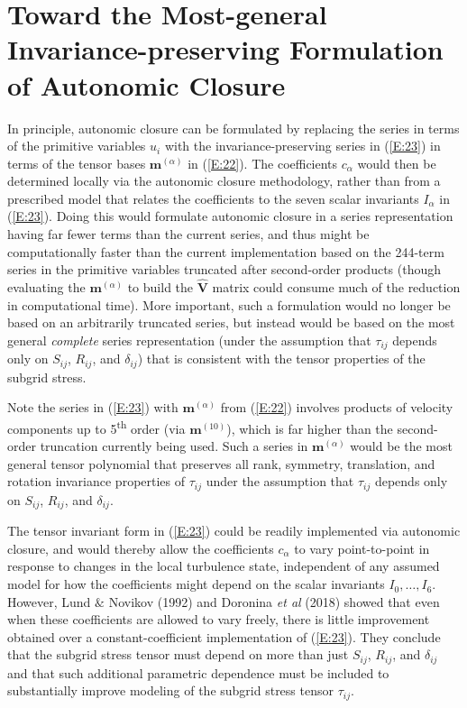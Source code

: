 \section{Toward the Most-general Invariance-preserving Formulation of Autonomic Closure} 
\label{sec:1B}

In principle, autonomic closure can be formulated by replacing the  series in terms of the primitive variables $u_i$  with the invariance-preserving series in (\ref{E:23}) in terms of the tensor bases $\mathbf{m}^{(\alpha)}$  in (\ref{E:22}). The coefficients $c_{\alpha}$  would then be determined locally via the autonomic closure methodology, rather than from a prescribed model that relates the coefficients to the seven scalar invariants $I_{\alpha}$ in (\ref{E:23}). Doing this would formulate autonomic closure in a series representation having far fewer terms than the current  series, and thus might be computationally faster than the current implementation based on the 244-term series in the primitive variables truncated after second-order products (though evaluating the  $\mathbf{m}^{(\alpha)}$  to build the $\mathbf{\widehat{V}}$  matrix could consume much of the reduction in computational time). More important, such a formulation would no longer be based on an arbitrarily truncated  series, but instead would be based on the most general \textit{complete} series representation (under the assumption that $\tau_{ij}$  depends only on $S_{ij}$, $R_{ij}$, and $\delta_{ij}$) that is consistent with the tensor properties of the subgrid stress. 

Note the series in (\ref{E:23}) with  $\mathbf{m}^{(\alpha)}$ from (\ref{E:22}) involves products of velocity components up to 5\textsuperscript{th} order (via $\mathbf{m}^{(10)}$), which is far higher than the second-order truncation currently being used. Such a series in  $\mathbf{m}^{(\alpha)}$ would be the most general tensor polynomial that preserves all rank, symmetry, translation, and rotation invariance properties of  $\tau_{ij}$ under the assumption that  $\tau_{ij}$ depends only on $S_{ij}$, $R_{ij}$, and $\delta_{ij}$.

The tensor invariant form in (\ref{E:23}) could be readily implemented via autonomic closure, and would thereby allow the coefficients $c_{\alpha}$  to vary point-to-point in response to changes in the local turbulence state, independent of any assumed model for how the coefficients might depend on the scalar invariants $I_0,\ldots,I_6$. However, Lund $\&$ Novikov (1992) and Doronina \textit{et al} (2018) showed that even when these coefficients are allowed to vary freely, there is little improvement obtained over a constant-coefficient implementation of (\ref{E:23}). They conclude that the subgrid stress tensor must depend on more than just $S_{ij}$, $R_{ij}$, and $\delta_{ij}$ and that such additional parametric dependence must be included to substantially improve modeling of the subgrid stress tensor $\tau_{ij}$.

